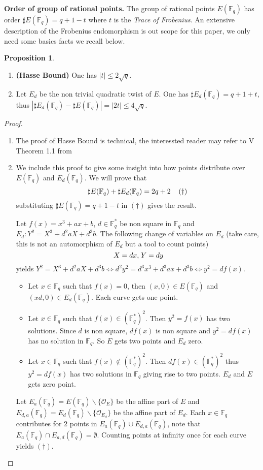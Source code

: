 \documentclass[10pt]{article}
\theoremstyle{definition}
\newtheorem{proposition}{Proposition}
\newcommand{\F}{\mathbb{F}}
\begin{document}
\noindent \textbf{Order of group of rational points.} The group of rational points $E(\F_q)$ has order $\sharp E(\F_q) = q + 1 -t$ where $t$ is the \textsl{Trace of Frobenius}.
An extensive description of the Frobenius endomorphism is out scope for this paper, we only need some basics facts we recall below.

\begin{proposition}
\begin{enumerate}
\item \textbf{(Hasse Bound)} One has $|t|  \leq 2 \sqrt{q}$.
\item Let $E_d$ be the non trivial quadratic twist of $E$.
One has $\sharp{} E_d(\F_q) = q+1+t$, thus $|\sharp{} E_d(\F_q) - \sharp{}E(\F_q)| = |2t|  \leq 4\sqrt{q}$.
\end{enumerate}
\end{proposition}
\begin{proof}
\begin{enumerate}
\item The proof of Hasse Bound is technical, the interessted reader may refer to V Theorem 1.1 from \cite{Silverman:EC} 
\item We include this proof to give some insight into how points distribute over $E(\F_q)$ and $E_d(\F_q)$.
We will prove that 
\[  \sharp{}E(\F_q) + \sharp{}E_d(\F_q) = 2q+2 \mkern20mu (\dagger)\]
substituting $\sharp E(\F_q) = q + 1 -t$ in $(\dagger)$ gives the result.

Let $f(x) = x^3+ax+b$, $d \in \F_q^*$ be non square in $\F_q$ and $E_d : Y^2 = X^3+d^2aX+d^3b$.
The following change of variables on $E_d$ (take care, this is not an automorphism of $E_d$ but a tool to count points)
\[ X = dx, \mkern2mu Y = dy \]
yields $ Y^2 = X^3+d^2aX+d^3b \Leftrightarrow d^2y^2 = d^3x^3+d^3ax+d^3b \Leftrightarrow y^2 = df(x)$. 

\begin{itemize}
\item Let $x \in \F_q$ such that $f(x) = 0$, then $(x,0) \in E(\F_q)$ and $(xd,0) \in E_d(\F_q)$.
Each curve gets one point.
\item Let $x \in \F_q$ such that $f(x) \in (\F_q^*)^2$.
Then $y^2 = f(x)$ has two solutions.
Since $d$ is non square, $df(x)$ is non square and $y^2 = df(x)$ has no solution in $\F_q$.
So $E$ gets two points and $E_d$ zero.
\item  Let $x \in \F_q$ such that $f(x) \notin (\F_q^*)^2$.
Then $df(x) \in (\F_q^*)^2$ thus $y^2 = df(x)$ has two solutions in $\F_q$ giving rise to two points.
$E_d$ and $E$ gets zero point.
\end{itemize}
Let $E_a(\F_q) = E(\F_q) \backslash \lbrace \mathcal{O}_E \rbrace$ be the affine part of $E$ and $E_{d,a}(\F_q) = E_d(\F_q) \backslash \lbrace \mathcal{O}_{E_d} \rbrace$ be the affine part of $E_d$.
Each $x \in \F_q$ contributes for $2$ points in $E_a(\F_q) \cup E_{d,a}(\F_q)$, note that $E_a(\F_q) \cap E_{a,d}(\F_q) =\emptyset $.
Counting points at infinity once for each curve yields $(\dagger)$.
\end{enumerate}
\end{proof}
\end{document}
